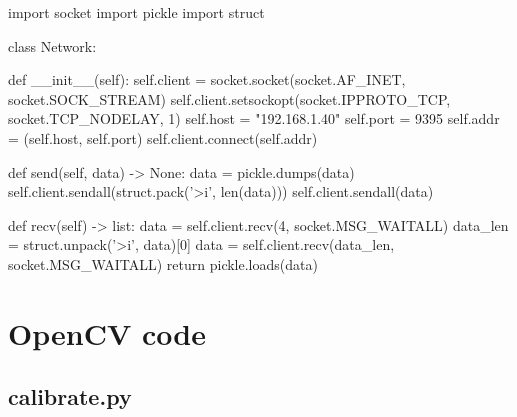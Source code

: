 \begin{pyverbatim}
import socket
import pickle
import struct


class Network:

    def __init__(self):
        self.client = socket.socket(socket.AF_INET, socket.SOCK_STREAM)
        self.client.setsockopt(socket.IPPROTO_TCP, socket.TCP_NODELAY, 1)
        self.host = "192.168.1.40"
        self.port = 9395
        self.addr = (self.host, self.port)
        self.client.connect(self.addr)

    def send(self, data) -> None:
        data = pickle.dumps(data)
        self.client.sendall(struct.pack('>i', len(data)))
        self.client.sendall(data)

    def recv(self) -> list:
        data = self.client.recv(4, socket.MSG_WAITALL)
        data_len = struct.unpack('>i', data)[0]
        data = self.client.recv(data_len, socket.MSG_WAITALL)
        return pickle.loads(data)

\end{pyverbatim}

\section{OpenCV code}

\subsection{calibrate.py}
\label{calibrate}

